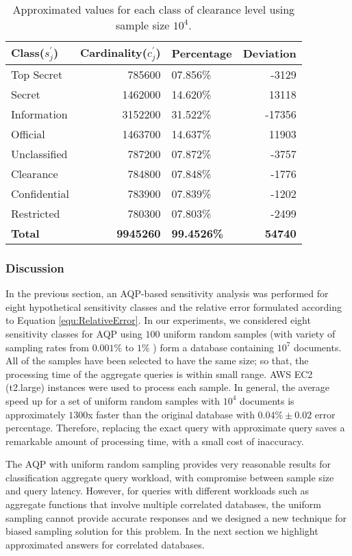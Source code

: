 \begin{table*}[h!]
\caption{Approximated values for each class of clearance level using sample size $10^4$.}
\label{tab:AproximatedDocumentClass}
\centering
\begin{tabular}{lrlr}
\toprule
\textbf{Class($s_j^\prime$)} & \textbf{Cardinality($c_j^\prime$)} & \textbf{Percentage} & \textbf{Deviation}\\
\midrule
Top Secret  & 785600  & 07.856\%   & -3129  \\ 
Secret      & 1462000 & 14.620\%   & 13118\\
Information & 3152200 & 31.522\%   & -17356\\
Official    & 1463700 & 14.637\%   & 11903 \\
Unclassified& 787200  & 07.872\%   & -3757 \\
Clearance   & 784800  & 07.848\%   & -1776 \\
Confidential& 783900  & 07.839\%   & -1202  \\
Restricted  & 780300  & 07.803\%   & -2499\\
\midrule
\textbf{Total}  & \textbf{9945260}  & \textbf{99.4526\%} & \textbf{54740}\\
\bottomrule
\end{tabular}
\end{table*}


\subsubsection{Discussion}
\label{subsubsec:Discussion}
In the previous section, an AQP-based sensitivity analysis was performed for eight hypothetical sensitivity classes and the relative error formulated according to Equation \ref{equ:RelativeError}. In our experiments, we considered eight sensitivity classes for AQP using $100$ uniform random samples (with variety of sampling rates from $0.001\%$  to $1\%$ ) form a database containing  $10^7$ documents. All of the samples have been selected to have the same size; so that, the processing time of the aggregate queries is within small range. AWS EC2 (t2.large) instances were used to process each sample. In general, the average speed up for a set of uniform random samples with $10^4$ documents is approximately $1300$x faster than the original database with $0.04\% \pm 0.02$ error percentage. Therefore, replacing the exact query with approximate query saves a remarkable amount of processing time, with a small cost of inaccuracy.

The AQP with uniform random sampling provides very reasonable results for classification aggregate query workload, with compromise between sample size and query latency. However, for queries with different workloads such as aggregate functions that involve multiple correlated databases, the uniform sampling cannot provide accurate responses and we designed a new technique for biased sampling solution for this problem. In the next section we highlight approximated answers for correlated databases.